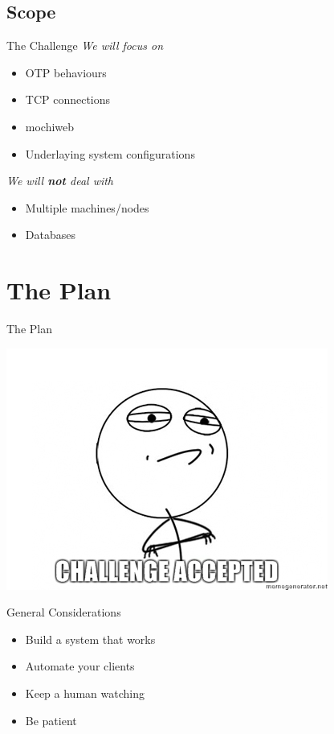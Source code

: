 \documentclass[utf8]{beamer}
\begin{document}
\subsection{Scope}
\begin{frame}{The Challenge}
	\emph{We will focus on}
	\begin{itemize}
		\item OTP behaviours
		\item TCP connections
		\item mochiweb
		\item Underlaying system configurations
	\end{itemize}
	\pause
	\emph{We will \textbf{not} deal with}
	\begin{itemize}
		\item Multiple machines/nodes
		\item Databases
	\end{itemize}
\end{frame}

\section{The Plan}
\begin{frame}{The Plan}
	\begin{center}
		\includegraphics[width=.65\textwidth]{img/challengeaccepted.jpg}
	\end{center}
\end{frame}

\begin{frame}{General Considerations}
	\begin{itemize}
		\item<1> Build a system that \alert{works}
		\item<2> Automate your clients
		\item<3> Keep a human watching
		\item<4> Be patient
	\end{itemize}
\end{frame}
\end{document}
